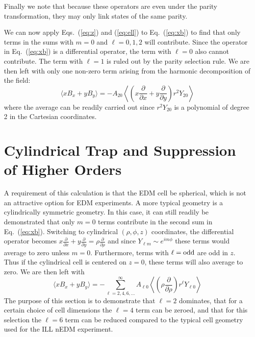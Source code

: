 \documentclass[preprint,12pt]{elsarticle}
\begin{document}
Finally we note that because these operators are even under the parity
transformation, they may only link states of the same parity.

We can now apply Eqs.~(\ref{eq:z}) and (\ref{eq:ell}) to
Eq.~(\ref{eq:xb}) to find that only terms in the sums with $m=0$ and
$\ell=0,1,2$ will contribute.  Since the operator in Eq.~(\ref{eq:xb})
is a differential operator, the term with $\ell=0$ also cannot
contribute.  The term with $\ell=1$ is ruled out by the parity
selection rule.  We are then left with only one non-zero term arising
from the harmonic decomposition of the field:
\begin{equation}
\langle
xB_x+yB_y\rangle=-A_{20}\left\langle\left(x\frac{\partial}{\partial
  x}+y\frac{\partial}{\partial y}\right)r^2 Y_{20}\right\rangle
\end{equation}
where the average can be readily carried out since $r^2Y_{20}$ is a
polynomial of degree 2 in the Cartesian coordinates.

\section{Cylindrical Trap and Suppression of Higher Orders}
\label{sec:cylinder}

A requirement of this calculation is that the EDM cell be spherical,
which is not an attractive option for EDM experiments.  A more typical
geometry is a cylindrically symmetric geometry.  In this case, it can
still readily be demonstrated that only $m=0$ terms contribute in the
second sum in Eq.~(\ref{eq:xb}).  Switching to cylindrical
$(\rho,\phi,z)$ coordinates, the differential operator becomes
$x\frac{\partial}{\partial x}+y\frac{\partial}{\partial
  y}=\rho\frac{\partial}{\partial\rho}$ and since $Y_{\ell m}\sim
e^{im\phi}$ these terms would average to zero unless $m=0$.
Furthermore, terms with $\ell={\rm odd}$ are odd in $z$.  Thus if the
cylindrical cell is centered on $z=0$, these terms will also average
to zero.  We are then left with
\begin{equation}
  \label{eq:cyl}
  \langle xB_x+yB_y\rangle=-\sum_{\ell=2,4,6,...}^\infty A_{\ell
    0}\left\langle\left(\rho\frac{\partial}{\partial
    \rho}\right)r^\ell Y_{\ell
    0}\right\rangle
\end{equation}
The purpose of this section is to demonstrate that $\ell=2$ dominates,
that for a certain choice of cell dimensions the $\ell=4$ term can be
zeroed, and that for this selection the $\ell=6$ term can be reduced
compared to the typical cell geometry used for the ILL nEDM
experiment.
\end{document}
